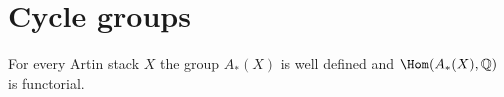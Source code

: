 \section{Cycle groups}\label{Kre99-sec-2}

\begin{theorem}\label{Kre99-thm-2.1}
For every Artin stack $X$ the group $A_*(X)$ is well defined and $\Hom(A_*(X), \mathbb{Q})$ is functorial.
\end{theorem}
